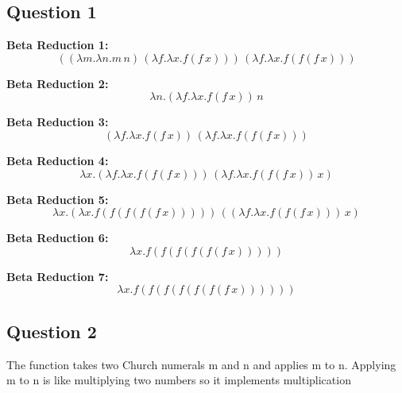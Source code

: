 \documentclass{article}
\theoremstyle{plain}
\theoremstyle{definition}
\theoremstyle{remark}
\begin{document}
\subsection{Question 1}

\textbf{Beta Reduction 1:}
\[
((\lambda m. \lambda n. m \, n) \, (\lambda f. \lambda x. f(f \, x))) \, (\lambda f. \lambda x. f(f(f \, x)))
\]

\textbf{Beta Reduction 2:}
\[
\lambda n. (\lambda f. \lambda x. f(f \, x)) \, n
\]

\textbf{Beta Reduction 3:}
\[
(\lambda f. \lambda x. f(f \, x)) \, (\lambda f. \lambda x. f(f(f \, x)))
\]

\textbf{Beta Reduction 4:}
\[
\lambda x. (\lambda f. \lambda x. f(f(f \, x))) \, (\lambda f. \lambda x. f(f(f \, x)) \, x)
\]

\textbf{Beta Reduction 5:}
\[
\lambda x. (\lambda x. f(f(f(f(f \, x))))) \, ((\lambda f. \lambda x. f(f(f \, x))) \, x)
\]

\textbf{Beta Reduction 6:}
\[
\lambda x. f(f(f(f(f(f \, x)))))
\]

\textbf{Beta Reduction 7:}
\[
\lambda x. f(f(f(f(f(f(f \, x))))))
\]


\subsection{Question 2}

The function takes two Church numerals m and n and applies m to n. Applying m to n is like multiplying two numbers so it implements multiplication
\end{document}
